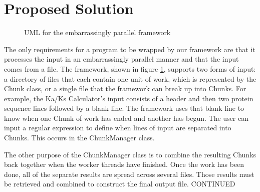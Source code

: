 \documentclass[12pt]{article}
\begin{document}
\section{Proposed Solution}
\begin{figure}
    \begin{center}
    \end{center}
    \caption{UML for the embarrassingly parallel framework}
    \label{fig:uml}
\end{figure}

The only requirements for a program to be wrapped by our framework are that it
processes the input in an embarrassingly parallel manner and that the input comes
from a file. The framework, shown in figure \ref{fig:uml}, supports two forms of input: a directory of files that each contain
one unit of work, which is represented by the Chunk class, or a single file that
the framework can break up into Chunks. For example, the Ka/Ks Calculator's
input consists of a header and then two protein sequence lines followed by a
blank line. The framework uses that blank line to know when one Chunk of work
has ended and another has begun. The user can input a regular expression to
define when lines of input are separated into Chunks. This occurs in the
ChunkManager class. 

The other purpose of the ChunkManager class is to combine the resulting Chunks
back together when the worker threads have finished. Once the work has been
done, all of the separate results are spread across several files. Those results
must be retrieved and combined to construct the final output file. CONTINUED 
\end{document}
